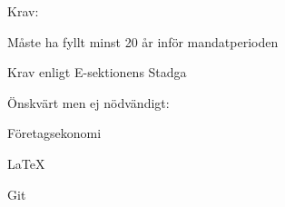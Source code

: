 \documentclass[10pt]{article}
\begin{document}
Krav:
\begin{dashlist}
    \item Måste ha fyllt minst 20 år inför mandatperioden
    \item Krav enligt E-sektionens Stadga
\end{dashlist}

Önskvärt men ej nödvändigt:
\begin{dashlist}
    \item Företagsekonomi
    \item \LaTeX
    \item Git
\end{dashlist}
\end{document}

